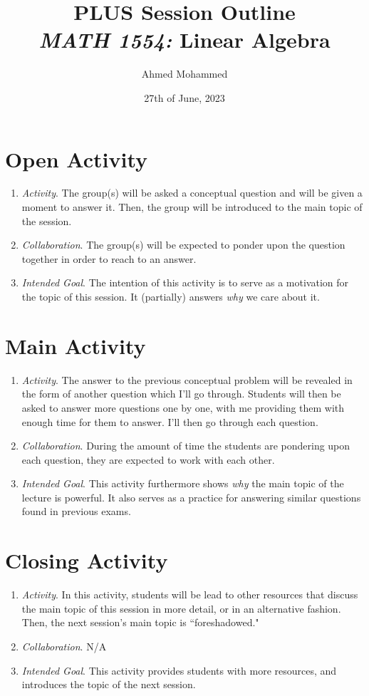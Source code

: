 \documentclass[11pt]{article}
\title{\Large PLUS Session Outline \\ \normalsize \textit{MATH 1554:} Linear Algebra}
\author{Ahmed Mohammed}
\date{27th of June, 2023}
\begin{document}
\thispagestyle{fancy}
\section{\centering Open Activity}
	\begin{enumerate}
		\item \textit{Activity}. The group(s) will be asked a conceptual question and will be given a moment to answer it. Then, the group will be introduced to the 
			main topic of the session.
		\item \textit{Collaboration}. The group(s) will be expected to ponder upon the question together in order to reach to an answer.
		\item \textit{Intended Goal}. The intention of this activity is to serve as a motivation for the topic of this session. It (partially) answers \textit{why} we
			care about it.
	\end{enumerate}

\section{\centering Main Activity}
	\begin{enumerate}
		\item \textit{Activity}. The answer to the previous conceptual problem will be revealed in the form of another question which I'll go through. Students will
			then be asked to answer more questions one by one, with me providing them with enough time for them to answer. I'll then go through each 
			question.
		\item \textit{Collaboration}. During the amount of time the students are pondering upon each question, they are expected to work with each other.
		\item \textit{Intended Goal}. This activity furthermore shows \textit{why} the main topic of the lecture is powerful. It also serves as a practice for 
			answering similar questions found in previous exams.
	\end{enumerate}

\section{\centering Closing Activity}
	\begin{enumerate}
		\item \textit{Activity}. In this activity, students will be lead to other resources that discuss the main topic of this session in more detail, or in an alternative
			fashion. Then, the next session's main topic is ``foreshadowed."
		\item \textit{Collaboration}. \textsc{N/A}
		\item \textit{Intended Goal}. This activity provides students with more resources, and introduces the topic of the next session.
	\end{enumerate}
\end{document}
